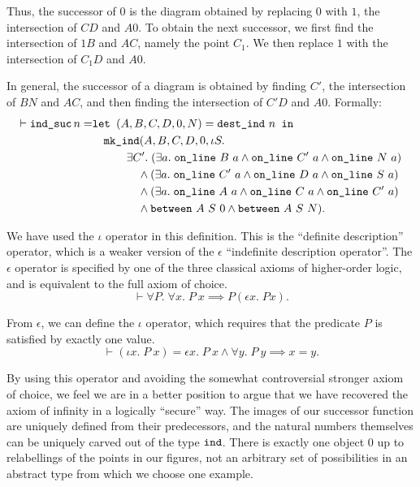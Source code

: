 Thus, the successor of $0$ is the diagram obtained by replacing $0$ with $1$, the intersection of $CD$ and $A0$. To obtain the next successor, we first find the intersection of $1B$ and $AC$, namely the point $C_1$. We then replace $1$ with the intersection of $C_1D$ and $A0$. 

In general, the successor of a diagram is obtained by finding $C'$, the intersection of $BN$ and $AC$, and then finding the intersection of $C'D$ and $A0$. Formally\label{sec:UseOfIota}:
\begin{align*}
\vdash \texttt{ind\_suc}\, n =& \texttt{let } (A,B,C,D,0,N) = \texttt{dest\_ind}\ n \texttt{ in}\\
&\quad \texttt{mk\_ind} (A,B,C,D,0,\iota S.\\
&\quad\qquad \exists C'.\; (\exists a.\;\texttt{on\_line}\ B\ a \wedge \texttt{on\_line}\ C'\ a \wedge \texttt{on\_line}\ N\ a)\\
&\qquad\qquad \wedge (\exists a.\;\texttt{on\_line}\ C'\ a \wedge \texttt{on\_line}\ D\ a \wedge \texttt{on\_line}\ S\ a)\\
&\qquad\qquad \wedge (\exists a.\;\texttt{on\_line}\ A\ a \wedge \texttt{on\_line}\ C\ a \wedge \texttt{on\_line}\ C'\ a)\\
&\qquad\qquad \wedge \texttt{between}\ A\ S\ 0 \wedge \texttt{between}\ A\ S\ N).
\end{align*}

We have used the $\iota$ operator in this definition. This is the ``definite description'' operator, which is a weaker version of the $\epsilon$ ``indefinite description operator''. The $\epsilon$ operator is specified by one of the three classical axioms of higher-order logic, and is equivalent to the full axiom of choice.
\begin{displaymath}
\vdash \forall P.\;\forall x.\; P\ x \implies P (\epsilon x.\; P x).
\end{displaymath}

From $\epsilon$, we can define the $\iota$ operator, which requires that the predicate $P$ is satisfied by exactly one value. 
\begin{displaymath}
  \vdash (\iota x.\; P\ x) = \epsilon x.\; P\ x \wedge \forall y.\; P\ y \implies x = y.
\end{displaymath}

By using this operator and avoiding the somewhat controversial stronger axiom of choice, we feel we are in a better position to argue that we have recovered the axiom of infinity in a logically ``secure'' way. The images of our successor function are uniquely defined from their predecessors, and the natural numbers themselves can be uniquely carved out of the type $\texttt{ind}$. There is exactly one object $0$ up to relabellings of the points in our figures, not an arbitrary set of possibilities in an abstract type from which we choose one example.

